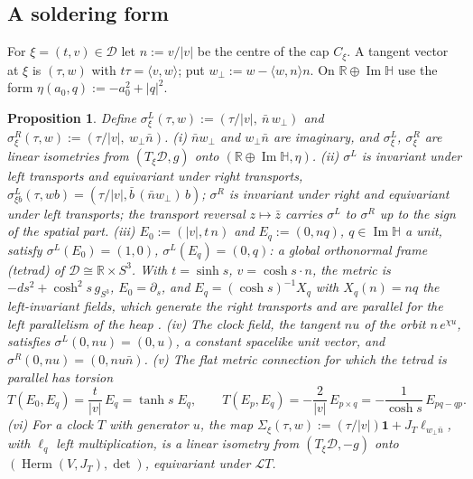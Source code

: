 \documentclass[aps,pra,onecolumn,superscriptaddress,nofootinbib,10pt]{revtex4-2}
\newtheorem{proposition}[theorem]{Proposition}
\theoremstyle{definition}
\theoremstyle{remark}
\newcommand{\R}{\mathbb{R}}
\newcommand{\HH}{\mathbb{H}}
\newcommand{\cL}{\mathcal{L}}
\newcommand{\cD}{\mathcal{D}}
\newcommand{\im}{\operatorname{Im}}
\newcommand{\Herm}{\operatorname{Herm}}
\newcommand{\ip}[2]{\langle #1,#2\rangle}
\begin{document}
\subsection{A soldering form}\label{sec:solder}
For $\xi=(t,v)\in\cD$ let $n:=v/\lvert v\rvert$ be the centre of the cap $C_\xi$.  A tangent vector at $\xi$
is $(\tau,w)$ with $t\tau=\ip{v}{w}$; put $w_\perp:=w-\ip{w}{n}n$.  On $\R\oplus\im\HH$ use the form
$\eta(a_0,q):=-a_0^2+\lvert q\rvert^2$.

\begin{proposition}\label{prop:solder}
Define $\sigma^L_\xi(\tau,w):=(\tau/\lvert v\rvert,\ \bar n\,w_\perp)$ and
$\sigma^R_\xi(\tau,w):=(\tau/\lvert v\rvert,\ w_\perp\bar n)$.
(i) $\bar nw_\perp$ and $w_\perp\bar n$ are imaginary, and $\sigma^L_\xi$, $\sigma^R_\xi$ are linear
isometries from $(T_\xi\cD,g)$ onto $(\R\oplus\im\HH,\eta)$.
(ii) $\sigma^L$ is invariant under left transports and equivariant under right transports,
$\sigma^L_{\xi b}(\tau,wb)=(\tau/\lvert v\rvert,\bar b\,(\bar nw_\perp)\,b)$; $\sigma^R$ is invariant under right
and equivariant under left transports; the transport reversal $z\mapsto\bar z$ carries $\sigma^L$ to
$\sigma^R$ up to the sign of the spatial part.
(iii) $E_0:=(\lvert v\rvert,t\,n)$ and $E_q:=(0,nq)$, $q\in\im\HH$ a unit, satisfy
$\sigma^L(E_0)=(1,0)$, $\sigma^L(E_q)=(0,q)$: a global orthonormal frame (tetrad) of $\cD\cong\R\times S^3$.
With $t=\sinh s$, $v=\cosh s\cdot n$, the metric is $-ds^2+\cosh^2s\,g_{S^3}$, $E_0=\partial_s$, and
$E_q=(\cosh s)^{-1}X_q$ with $X_q(n)=nq$ the left-invariant fields, which generate the right transports
and are parallel for the left parallelism of the heap \cite[Prop.~5.3]{PaperI}.
(iv) The clock field, the tangent $nu$ of the orbit $n\,e^{\chi u}$, satisfies $\sigma^L(0,nu)=(0,u)$, a
constant spacelike unit vector, and $\sigma^R(0,nu)=(0,nu\bar n)$.
(v) The flat metric connection for which the tetrad is parallel has torsion
\[
T(E_0,E_q)=\frac{t}{\lvert v\rvert}\,E_q=\tanh s\;E_q,\qquad
T(E_p,E_q)=-\frac{2}{\lvert v\rvert}\,E_{p\times q}=-\frac1{\cosh s}\,E_{pq-qp}.
\]
(vi) For a clock $T$ with generator $u$, the map
$\Sigma_\xi(\tau,w):=(\tau/\lvert v\rvert)\mathbf1+J_T\ell_{w_\perp\bar n}$, with $\ell_q$ left multiplication,
is a linear isometry from $(T_\xi\cD,-g)$ onto $(\Herm(V,J_T),\det)$, equivariant under $\cL T$.
\end{proposition}
\end{document}
